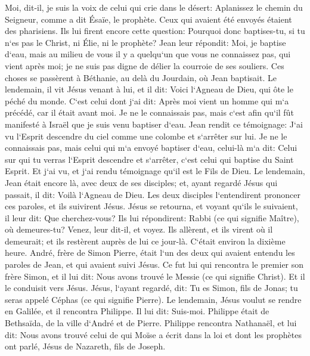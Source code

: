 \verse Moi, dit-il, je suis la voix de celui qui crie dans le désert: Aplanissez le chemin du Seigneur, comme a dit Ésaïe, le prophète. 
\verse Ceux qui avaient été envoyés étaient des pharisiens. 
\verse Ils lui firent encore cette question: Pourquoi donc baptises-tu, si tu n`es pas le Christ, ni Élie, ni le prophète? 
\verse Jean leur répondit: Moi, je baptise d`eau, mais au milieu de vous il y a quelqu`un que vous ne connaissez pas, qui vient après moi; 
\verse je ne suis pas digne de délier la courroie de ses souliers. 
\verse Ces choses se passèrent à Béthanie, au delà du Jourdain, où Jean baptisait. 
\verse Le lendemain, il vit Jésus venant à lui, et il dit: Voici l`Agneau de Dieu, qui ôte le péché du monde. 
\verse C`est celui dont j`ai dit: Après moi vient un homme qui m`a précédé, car il était avant moi. 
\verse Je ne le connaissais pas, mais c`est afin qu`il fût manifesté à Israël que je suis venu baptiser d`eau. 
\verse Jean rendit ce témoignage: J`ai vu l`Esprit descendre du ciel comme une colombe et s`arrêter sur lui. 
\verse Je ne le connaissais pas, mais celui qui m`a envoyé baptiser d`eau, celui-là m`a dit: Celui sur qui tu verras l`Esprit descendre et s`arrêter, c`est celui qui baptise du Saint Esprit. 
\verse Et j`ai vu, et j`ai rendu témoignage qu`il est le Fils de Dieu. 
\verse Le lendemain, Jean était encore là, avec deux de ses disciples; 
\verse et, ayant regardé Jésus qui passait, il dit: Voilà l`Agneau de Dieu. 
\verse Les deux disciples l`entendirent prononcer ces paroles, et ils suivirent Jésus. 
\verse Jésus se retourna, et voyant qu`ils le suivaient, il leur dit: Que cherchez-vous? Ils lui répondirent: Rabbi (ce qui signifie Maître), où demeures-tu? 
\verse Venez, leur dit-il, et voyez. Ils allèrent, et ils virent où il demeurait; et ils restèrent auprès de lui ce jour-là. C`était environ la dixième heure. 
\verse André, frère de Simon Pierre, était l`un des deux qui avaient entendu les paroles de Jean, et qui avaient suivi Jésus. 
\verse Ce fut lui qui rencontra le premier son frère Simon, et il lui dit: Nous avons trouvé le Messie (ce qui signifie Christ). 
\verse Et il le conduisit vers Jésus. Jésus, l`ayant regardé, dit: Tu es Simon, fils de Jonas; tu seras appelé Céphas (ce qui signifie Pierre). 
\verse Le lendemain, Jésus voulut se rendre en Galilée, et il rencontra Philippe. Il lui dit: Suis-moi. 
\verse Philippe était de Bethsaïda, de la ville d`André et de Pierre. 
\verse Philippe rencontra Nathanaël, et lui dit: Nous avons trouvé celui de qui Moïse a écrit dans la loi et dont les prophètes ont parlé, Jésus de Nazareth, fils de Joseph. 
